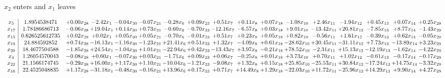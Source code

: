 \documentclass[9pt]{article}
\begin{document}
 $ x_{2} $ enters and $ x_{1} $ leaves 

 \[\begin{array}{c| c c@{\hskip 2pt} c@{\hskip 2pt} c@{\hskip 2pt} c@{\hskip 2pt} c@{\hskip 2pt} c@{\hskip 2pt} c@{\hskip 2pt} c@{\hskip 2pt} c@{\hskip 2pt} c@{\hskip 2pt} c@{\hskip 2pt} c@{\hskip 2pt} c@{\hskip 2pt} c@{\hskip 2pt} c@{\hskip 2pt} }
 x_{5}   &  1.8954538471 & +  0.00 x_{28} & -2.42 x_{1} & -0.04 x_{30} & -0.07 x_{21} & -0.28 x_{6} & +  0.09 x_{23} & +  0.51 x_{7} & +  0.11 x_{8} & +  0.07 x_{18} & -1.08 x_{10} & +  2.46 x_{11} & -1.94 x_{12} & +  0.45 x_{13} & +  0.07 x_{14} & +  0.25 x_{29}\\
 x_{17}   &  1.78486686713 & -0.06 x_{28} & + 19.04 x_{1} & +  0.14 x_{30} & +  0.73 x_{21} & -0.60 x_{6} & -0.70 x_{23} & -12.16 x_{7} & -6.57 x_{8} & +  0.03 x_{18} & +  9.01 x_{10} & -13.42 x_{11} & + 20.81 x_{12} & -7.85 x_{13} & +  8.77 x_{14} & -1.43 x_{29}\\
 x_{15}   &  0.626525612735 & +  0.02 x_{28} & +  0.02 x_{1} & +  0.05 x_{30} & +  0.05 x_{21} & -0.70 x_{6} & -0.01 x_{23} & +  0.51 x_{7} & +  0.23 x_{8} & +  0.05 x_{18} & +  0.82 x_{10} & -0.56 x_{11} & +  1.61 x_{12} & -0.39 x_{13} & +  0.62 x_{14} & -0.05 x_{29}\\
 x_{19}   &  24.884592852 & +  0.74 x_{28} & -16.13 x_{1} & -1.16 x_{30} & -1.23 x_{21} & + 21.41 x_{6} & +  0.51 x_{23} & +  1.32 x_{7} & -4.09 x_{8} & +  0.61 x_{18} & -28.62 x_{10} & + 30.45 x_{11} & -31.11 x_{12} & +  7.73 x_{13} & -13.89 x_{14} & +  3.23 x_{29}\\
 x_{20}   &  18.4677504588 & -1.85 x_{28} & + 24.54 x_{1} & -1.04 x_{30} & +  1.01 x_{21} & -22.94 x_{6} & +  0.42 x_{23} & -13.43 x_{7} & +  3.97 x_{8} & -0.21 x_{18} & + 78.52 x_{10} & -2.31 x_{11} & + 15.13 x_{12} & -12.19 x_{13} & -1.62 x_{14} & -4.22 x_{29}\\
 x_{4}   &  1.26054570043 & -0.08 x_{28} & +  0.60 x_{1} & -0.07 x_{30} & +  0.03 x_{21} & -1.71 x_{6} & +  0.09 x_{23} & +  0.06 x_{7} & -0.25 x_{8} & +  0.01 x_{18} & +  3.73 x_{10} & +  0.70 x_{11} & +  1.02 x_{12} & -0.61 x_{13} & -0.17 x_{14} & -0.17 x_{29}\\
 x_{22}   &  21.1566174745 & -0.29 x_{28} & + 16.00 x_{1} & +  1.17 x_{30} & +  1.10 x_{21} & -10.04 x_{6} & -1.21 x_{23} & -9.08 x_{7} & +  1.32 x_{8} & +  0.15 x_{18} & + 25.85 x_{10} & -25.53 x_{11} & + 30.84 x_{12} & -17.24 x_{13} & + 14.75 x_{14} & -3.32 x_{29}\\
 x_{16}   &  22.4525048835 & +  1.17 x_{28} & -31.18 x_{1} & -0.48 x_{30} & -0.16 x_{21} & + 13.96 x_{6} & +  0.17 x_{23} & +  0.71 x_{7} & + 14.49 x_{8} & +  1.29 x_{18} & -22.03 x_{10} & + 11.72 x_{11} & -25.96 x_{12} & + 14.29 x_{13} & +  9.90 x_{14} & +  4.27 x_{29}\\

\end{array}\]
\end{document}
